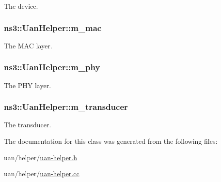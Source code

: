 The device. 

\subsubsection[{\texorpdfstring{m\+\_\+mac}{m_mac}}]{ ns3\+::\+Uan\+Helper\+::m\+\_\+mac\hspace{0.3cm}{\ttfamily [private]}}\hypertarget{classns3_1_1UanHelper_a6556792e4c972424dd41d1d800880cc8}{}\label{classns3_1_1UanHelper_a6556792e4c972424dd41d1d800880cc8}


The M\+AC layer. 

\subsubsection[{\texorpdfstring{m\+\_\+phy}{m_phy}}]{ ns3\+::\+Uan\+Helper\+::m\+\_\+phy\hspace{0.3cm}{\ttfamily [private]}}\hypertarget{classns3_1_1UanHelper_a30140863225d35593e083ffdbdad4aae}{}\label{classns3_1_1UanHelper_a30140863225d35593e083ffdbdad4aae}


The P\+HY layer. 

\subsubsection[{\texorpdfstring{m\+\_\+transducer}{m_transducer}}]{ ns3\+::\+Uan\+Helper\+::m\+\_\+transducer\hspace{0.3cm}{\ttfamily [private]}}\hypertarget{classns3_1_1UanHelper_a3c3c7bacb7a21e76746c3aa96a9b67f6}{}\label{classns3_1_1UanHelper_a3c3c7bacb7a21e76746c3aa96a9b67f6}


The transducer. 



The documentation for this class was generated from the following files\+:\begin{DoxyCompactItemize}
\item 
uan/helper/\hyperlink{uan-helper_8h}{uan-\/helper.\+h}\item 
uan/helper/\hyperlink{uan-helper_8cc}{uan-\/helper.\+cc}\end{DoxyCompactItemize}
